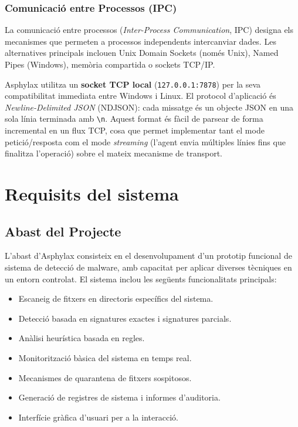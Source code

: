 \documentclass[12pt,a4paper]{report}
\begin{document}
\subsection{Comunicació entre Processos (IPC)}
La comunicació entre processos (\textit{Inter-Process Communication}, IPC) designa els mecanismes que permeten a processos independents intercanviar dades. Les alternatives principals inclouen Unix Domain Sockets (només Unix), Named Pipes (Windows), memòria compartida o sockets TCP/IP.

Asphylax utilitza un \textbf{socket TCP local} (\texttt{127.0.0.1:7878}) per la seva compatibilitat immediata entre Windows i Linux. El protocol d'aplicació és \textit{Newline-Delimited JSON} (NDJSON): cada missatge és un objecte JSON en una sola línia terminada amb \texttt{\textbackslash n}. Aquest format és fàcil de parsear de forma incremental en un flux TCP, cosa que permet implementar tant el mode petició/resposta com el mode \textit{streaming} (l'agent envia múltiples línies fins que finalitza l'operació) sobre el mateix mecanisme de transport.


\chapter{Requisits del sistema}
\label{ch:requisits}

\section{Abast del Projecte}
L'abast d'Asphylax consisteix en el desenvolupament d'un prototip funcional de sistema de detecció de malware, amb capacitat per aplicar diverses tècniques en un entorn controlat. El sistema inclou les següents funcionalitats principals:
\begin{itemize}
    \item Escaneig de fitxers en directoris específics del sistema.
    \item Detecció basada en signatures exactes i signatures parcials.
    \item Anàlisi heurística basada en regles.
    \item Monitorització bàsica del sistema en temps real.
    \item Mecanismes de quarantena de fitxers sospitosos.
    \item Generació de registres de sistema i informes d'auditoria.
    \item Interfície gràfica d'usuari per a la interacció.
\end{itemize}
\end{document}
